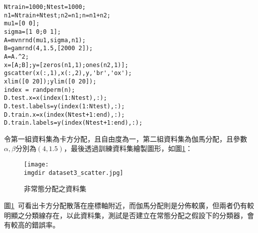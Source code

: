\begin{enumerate}
{	\begin{lstlisting}
Ntrain=1000;Ntest=1000;
n1=Ntrain+Ntest;n2=n1;n=n1+n2;
mu1=[0 0];
sigma=[1 0;0 1];
A=mvnrnd(mu1,sigma,n1);
B=gamrnd(4,1.5,[2000 2]);
A=A.^2;
x=[A;B];y=[zeros(n1,1);ones(n2,1)];
gscatter(x(:,1),x(:,2),y,'br','ox');
xlim([0 20]);ylim([0 20]);
index = randperm(n);
D.test.x=x(index(1:Ntest),:); 
D.test.labels=y(index(1:Ntest),:);
D.train.x=x(index(Ntest+1:end),:); 
D.train.labels=y(index(Ntest+1:end),:);	
	\end{lstlisting}
	令第一組資料集為卡方分配，且自由度為一，第二組資料集為伽馬分配，且參數$\alpha,\beta$分別為$(4,1.5)$，最後透過訓練資料集繪製圖形，如圖\ref{fig:dataset3_scatter}：
	\begin{figure}[H]	
		\centering	 			 	 
   		\texttt{[image: \\imgdir dataset3\_scatter.jpg]} 
   		\caption{非常態分配之資料集}
   		\label{fig:dataset3_scatter}   			 		 
	\end{figure}	
	圖\ref{fig:dataset3_scatter}\ 可看出卡方分配散落在座標軸附近，而伽馬分配則是分佈較廣，但兩者仍有較明顯之分類線存在，以此資料集，測試是否建立在常態分配之假設下的分類器，會有較高的錯誤率。
	}
	\end{enumerate}
	
